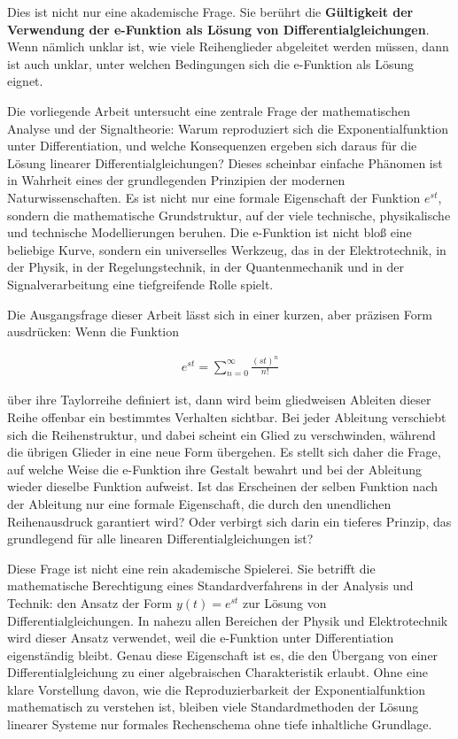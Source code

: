 \documentclass[a4paper,12pt,twoside]{report}
\theoremstyle{definition}
\begin{document}
Dies ist nicht nur eine akademische Frage. Sie berührt die \textbf{Gültigkeit der Verwendung der e-Funktion als Lösung von Differentialgleichungen}. Wenn nämlich unklar ist, wie viele Reihenglieder abgeleitet werden müssen, dann ist auch unklar, unter welchen Bedingungen sich die e-Funktion als Lösung eignet.

Die vorliegende Arbeit untersucht eine zentrale Frage der mathematischen Analyse und der Signaltheorie: Warum reproduziert sich die Exponentialfunktion unter Differentiation, und welche Konsequenzen ergeben sich daraus für die Lösung linearer Differentialgleichungen? Dieses scheinbar einfache Phänomen ist in Wahrheit eines der grundlegenden Prinzipien der modernen Naturwissenschaften. Es ist nicht nur eine formale Eigenschaft der Funktion $e^{st}$, sondern die mathematische Grundstruktur, auf der viele technische, physikalische und technische Modellierungen beruhen. Die e-Funktion ist nicht bloß eine beliebige Kurve, sondern ein universelles Werkzeug, das in der Elektrotechnik, in der Physik, in der Regelungstechnik, in der Quantenmechanik und in der Signalverarbeitung eine tiefgreifende Rolle spielt.

Die Ausgangsfrage dieser Arbeit lässt sich in einer kurzen, aber präzisen Form ausdrücken: Wenn die Funktion

\begin{align}
    e^{st} = \sum_{n=0}^{\infty} \frac{(st)^n}{n!}
\end{align}

über ihre Taylorreihe definiert ist, dann wird beim gliedweisen Ableiten dieser Reihe offenbar ein bestimmtes Verhalten sichtbar. Bei jeder Ableitung verschiebt sich die Reihenstruktur, und dabei scheint ein Glied zu verschwinden, während die übrigen Glieder in eine neue Form übergehen. Es stellt sich daher die Frage, auf welche Weise die e-Funktion ihre Gestalt bewahrt und bei der Ableitung wieder dieselbe Funktion aufweist. Ist das Erscheinen der selben Funktion nach der Ableitung nur eine formale Eigenschaft, die durch den unendlichen Reihenausdruck garantiert wird? Oder verbirgt sich darin ein tieferes Prinzip, das grundlegend für alle linearen Differentialgleichungen ist?

Diese Frage ist nicht eine rein akademische Spielerei. Sie betrifft die mathematische Berechtigung eines Standardverfahrens in der Analysis und Technik: den Ansatz der Form $y(t) = e^{st}$ zur Lösung von Differentialgleichungen. In nahezu allen Bereichen der Physik und Elektrotechnik wird dieser Ansatz verwendet, weil die e-Funktion unter Differentiation eigenständig bleibt. Genau diese Eigenschaft ist es, die den Übergang von einer Differentialgleichung zu einer algebraischen Charakteristik erlaubt. Ohne eine klare Vorstellung davon, wie die Reproduzierbarkeit der Exponentialfunktion mathematisch zu verstehen ist, bleiben viele Standardmethoden der Lösung linearer Systeme nur formales Rechenschema ohne tiefe inhaltliche Grundlage.
\end{document}
